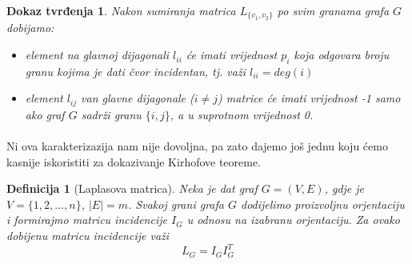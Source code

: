 \documentclass[11pt]{article}
\newtheorem{definition}{Definicija}
\newtheorem*{custom_proof}{Dokaz tvrđenja}
\begin{document}
			\begin{custom_proof}
			Nakon sumiranja matrica $L_{\{v_1,v_2\}}$ po svim granama grafa $G$ dobijamo:
				\begin{itemize}
				\item element na glavnoj dijagonali $l_{ii}$ će imati vrijednost $p_i$ koja odgovara broju granu kojima je dati čvor incidentan, tj. važi $l_{ii} = deg(i)$
				\item element $l_{ij}$ van glavne dijagonale ($i \neq j$) matrice će imati vrijednost -1 samo ako graf $G$ sadrži granu $\{i,j\}$, a u suprotnom vrijednost 0.  
				\end{itemize}
			\end{custom_proof}
		
			\paragraph{}
			Ni ova karakterizazija nam nije dovoljna, pa zato dajemo još jednu koju ćemo kasnije iskoristiti za dokazivanje Kirhofove teoreme.
	
			\begin{definition}[Laplasova matrica] 
			Neka je dat graf $G = (V, E)$, gdje je $V = \{1, 2, \dots, n\}$, $|E| = m$. Svakoj grani grafa $G$ dodijelimo proizvoljnu orjentaciju i formirajmo matricu incidencije $I_G$ u odnosu na izabranu orjentaciju.
			Za ovako dobijenu matricu incidencije važi
			 \[
				 L_G = I_G I_G^T
			 \]
			\end{definition}
	
\end{document}
